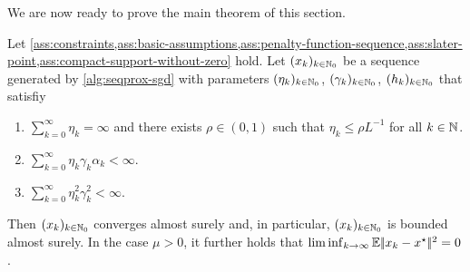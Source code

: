 We are now ready to prove the main theorem of this section.
\begin{theorem}
    \label{thm:almost-sure-convergence}
    Let \cref{ass:constraints,ass:basic-assumptions,ass:penalty-function-sequence,ass:slater-point,ass:compact-support-without-zero} hold.
    Let $(x_k)_{k\in\mathbb{N}_0}$ be a sequence generated by \cref{alg:seqprox-sgd} with
    parameters $(\eta_k)_{k\in\mathbb{N}_0}$, $(\gamma_k)_{k\in\mathbb{N}_0}$, $(h_k)_{k\in\mathbb{N}_0}$ that satisfiy
    \begin{enumerate}
        \item $\sum_{k=0}^\infty \eta_k = \infty$ and there exists $\rho\in(0,1)$ such that $\eta_k \leq \rho L^{-1}$ for all $k\in\mathbb{N}$.
        \item $\sum_{k=0}^\infty \eta_k\gamma_k\alpha_k < \infty$.
        \item $\sum_{k=0}^\infty \eta_k^2 \gamma_k^2 < \infty$.
    \end{enumerate}
    Then $(x_k)_{k\in\mathbb{N}_0}$ converges almost surely and,
    in particular, $(x_k)_{k\in\mathbb{N}_0}$ is bounded almost surely.
    In the case $\mu > 0$, it further holds that
    $\liminf_{k\to\infty} \mathbb{E}|\!|x_{k} - x^\star|\!|^2 = 0$.
\end{theorem}

